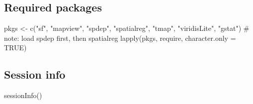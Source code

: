 \documentclass[
  letterpaper,
]{scrbook}
\newenvironment{Shaded}{\begin{snugshade}}{\end{snugshade}}
\newcommand{\AttributeTok}[1]{\textcolor[rgb]{0.40,0.45,0.13}{#1}}
\newcommand{\CommentTok}[1]{\textcolor[rgb]{0.37,0.37,0.37}{#1}}
\newcommand{\ConstantTok}[1]{\textcolor[rgb]{0.56,0.35,0.01}{#1}}
\newcommand{\FunctionTok}[1]{\textcolor[rgb]{0.28,0.35,0.67}{#1}}
\newcommand{\NormalTok}[1]{\textcolor[rgb]{0.00,0.23,0.31}{#1}}
\newcommand{\OtherTok}[1]{\textcolor[rgb]{0.00,0.23,0.31}{#1}}
\newcommand{\StringTok}[1]{\textcolor[rgb]{0.13,0.47,0.30}{#1}}
\begin{document}
\hypertarget{required-packages-4}{%
\subsection*{Required packages}\label{required-packages-4}}

\begin{Shaded}
\begin{Highlighting}[]
\NormalTok{pkgs }\OtherTok{\textless{}{-}} \FunctionTok{c}\NormalTok{(}\StringTok{"sf"}\NormalTok{, }\StringTok{"mapview"}\NormalTok{, }\StringTok{"spdep"}\NormalTok{, }\StringTok{"spatialreg"}\NormalTok{, }\StringTok{"tmap"}\NormalTok{, }\StringTok{"viridisLite"}\NormalTok{, }\StringTok{"gstat"}\NormalTok{) }\CommentTok{\# note: load spdep first, then spatialreg}
\FunctionTok{lapply}\NormalTok{(pkgs, require, }\AttributeTok{character.only =} \ConstantTok{TRUE}\NormalTok{)}
\end{Highlighting}
\end{Shaded}

\hypertarget{session-info-4}{%
\subsection*{Session info}\label{session-info-4}}

\begin{Shaded}
\begin{Highlighting}[]
\FunctionTok{sessionInfo}\NormalTok{()}
\end{Highlighting}
\end{Shaded}
\end{document}
